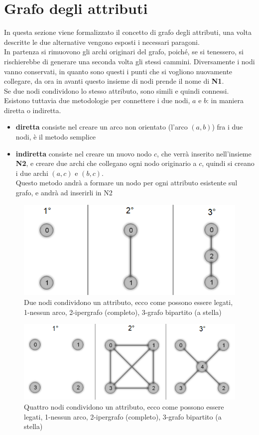 \section{Grafo degli attributi}
In questa sezione viene formalizzato il concetto di grafo degli attributi, una volta descritte le due alternative vengono esposti i necessari paragoni.\\
In partenza si rimuovono gli archi originari del grafo, poiché, se si tenessero, si rischierebbe di generare una seconda volta gli stessi cammini. Diversamente i nodi vanno conservati, in quanto sono questi i punti che si vogliono nuovamente collegare, da ora in avanti questo insieme di nodi prende il nome di \textbf{N1}.\\
Se due nodi condividono lo stesso attributo, sono simili e quindi connessi. Esistono tuttavia due metodologie per connettere i due nodi, $a$ e $b$: in maniera diretta o indiretta.
\begin{itemize}
	\item \textbf{diretta} consiste nel creare un arco non orientato (l'arco $(a, b)$) fra i due nodi, è il metodo semplice
	\item \textbf{indiretta} consiste nel creare un nuovo nodo $c$, che verrà inserito nell'insieme \textbf{N2}, e creare due archi che collegano ogni nodo originario a $c$, quindi si creano i due archi $(a, c)$ e $(b, c)$.\\
	Questo metodo andrà a formare un nodo per ogni attributo esistente sul grafo, e andrà ad inserirli in N2
\end{itemize}
%
\begin{figure}[htp]
	\centering
	\includegraphics{immagini/add_att2}
	\caption{Due nodi condividono un attributo, ecco come possono essere legati, 1-nessun arco, 2-ipergrafo (completo), 3-grafo bipartito (a stella)}
	\label{fig:add_att2}
\end{figure}
\begin{figure}[htp]
	\centering
	\includegraphics[width=\linewidth]{immagini/add_att4}
	\caption{Quattro nodi condividono un attributo, ecco come possono essere legati, 1-nessun arco, 2-ipergrafo (completo), 3-grafo bipartito (a stella)}
	\label{fig:add_att4}
\end{figure}

